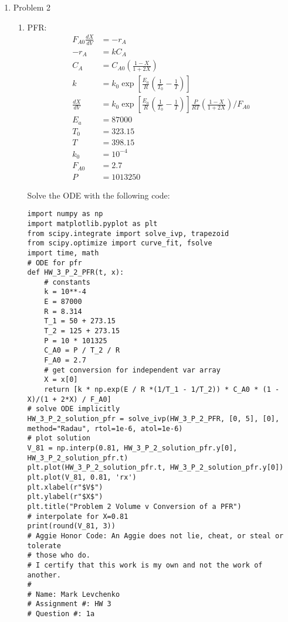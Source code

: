 \documentclass[12pt]{article}
\begin{document}
\begin{enumerate}
\newpage
    \item Problem 2
    \begin{enumerate}
        \item PFR:
        \begin{align*}
            F_{A0} \frac{dX}{dV} &= -r_A \\
            -r_A &= k C_A \\
            C_A &= C_{A0} \left( \frac{1 - X}{1 + 2 X} \right) \\
            k &= k_0 \exp\left[ \frac{E_a}{R} \left( \frac{1}{T_0} - \frac{1}{T} \right) \right] \\
            \frac{dX}{dV} &= k_0 \exp\left[ \frac{E_a}{R} \left( \frac{1}{T_0} - \frac{1}{T} \right) \right] \frac{P}{RT} \left( \frac{1 - X}{1 + 2 X} \right) / F_{A0} \\
            E_a &= 87000 \\
            T_0 &= 323.15 \\
            T &= 398.15 \\
            k_0 &= 10^{-4} \\
            F_{A0} &= 2.7 \\
            P &= 1013250
        \end{align*}

        Solve the ODE with the following code:

\begin{verbatim}
import numpy as np
import matplotlib.pyplot as plt
from scipy.integrate import solve_ivp, trapezoid
from scipy.optimize import curve_fit, fsolve
import time, math
# ODE for pfr
def HW_3_P_2_PFR(t, x):
    # constants
    k = 10**-4
    E = 87000
    R = 8.314
    T_1 = 50 + 273.15
    T_2 = 125 + 273.15
    P = 10 * 101325
    C_A0 = P / T_2 / R
    F_A0 = 2.7
    # get conversion for independent var array
    X = x[0]
    return [k * np.exp(E / R *(1/T_1 - 1/T_2)) * C_A0 * (1 - X)/(1 + 2*X) / F_A0]
# solve ODE implicitly
HW_3_P_2_solution_pfr = solve_ivp(HW_3_P_2_PFR, [0, 5], [0],  method="Radau", rtol=1e-6, atol=1e-6)
# plot solution
V_81 = np.interp(0.81, HW_3_P_2_solution_pfr.y[0], HW_3_P_2_solution_pfr.t)
plt.plot(HW_3_P_2_solution_pfr.t, HW_3_P_2_solution_pfr.y[0])
plt.plot(V_81, 0.81, 'rx')
plt.xlabel(r"$V$")
plt.ylabel(r"$X$")
plt.title("Problem 2 Volume v Conversion of a PFR")
# interpolate for X=0.81
print(round(V_81, 3))
# Aggie Honor Code: An Aggie does not lie, cheat, or steal or tolerate
# those who do.
# I certify that this work is my own and not the work of another.
#
# Name: Mark Levchenko
# Assignment #: HW 3
# Question #: 1a
\end{verbatim}


\end{enumerate}
\end{enumerate}
\end{document}

